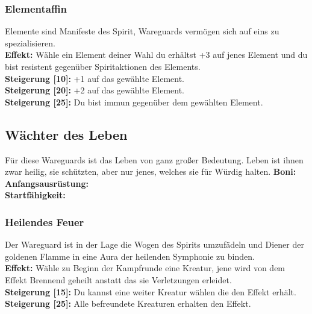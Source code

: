 \subsubsection*{Elementaffin} \label{sk:elementaffin}
Elemente sind Manifeste des Spirit, Wareguards vermögen sich auf eins zu spezialisieren. \\
\textbf{Effekt:} Wähle ein Element deiner Wahl du erhältst +3 auf jenes Element und du bist resistent gegenüber Spiritaktionen des Elements.\\
\textbf{Steigerung [10]:} +1 auf das gewählte Element.\\
\textbf{Steigerung [20]:} +2 auf das gewählte Element.\\
\textbf{Steigerung [25]:} Du bist immun gegenüber dem gewählten Element.\\


\subsection*{Wächter des Leben}
Für diese Wareguards ist das Leben von ganz großer Bedeutung. Leben ist ihnen zwar heilig, sie schützten, aber nur jenes, welches sie für Würdig halten.
\textbf{Boni:} \\
\textbf{Anfangsausrüstung:} \\
\textbf{Startfähigkeit:}  \\

\subsubsection*{Heilendes Feuer} \label{sk:heilendes_feuer}
Der Wareguard ist in der Lage die Wogen des Spirits umzufädeln und Diener der goldenen Flamme in eine Aura der heilenden Symphonie zu binden. \\
\textbf{Effekt:} Wähle zu Beginn der Kampfrunde eine Kreatur, jene wird von dem Effekt Brennend geheilt anstatt das sie Verletzungen erleidet.\\
\textbf{Steigerung [15]:} Du kannst eine weiter Kreatur wählen die den Effekt erhält.\\
\textbf{Steigerung [25]:} Alle befreundete Kreaturen erhalten den Effekt.\\